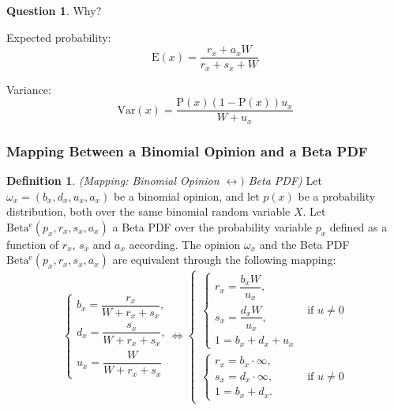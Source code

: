 \documentclass[a4paper,12pt]{article}
\theoremstyle{definition}
\newtheorem{question}{Question}[section]
\newtheorem{definition}{Definition}[section]
\numberwithin{equation}{section}
\begin{document}
\begin{question}
	Why?
\end{question} 

Expected probability:
\begin{equation}
	\mathrm{E}(x) = \frac{r_x + a_x W}{r_x + s_x + W}
\end{equation}

Variance:
\begin{equation}
	\mathrm{Var}(x) = \frac{\mathrm{P}(x)(1 - \mathrm{P}(x))u_x}{W + u_x}
\end{equation}

\subsubsection{Mapping Between a Binomial Opinion and a Beta PDF}

\begin{definition}
	\emph{(Mapping: Binomial Opinion $\leftrightarrow)$ Beta PDF)} Let $\omega_x = (b_x, d_x, u_x, a_x)$ be a binomial opinion, and let $p(x)$ be a probability distribution, both over the same binomial random variable $X$. Let $\mathrm{Beta^e}(p_x, r_x, s_x, a_x)$ a Beta PDF over the probability variable $p_x$ defined as a function of $r_x$, $s_x$ and
$a_x$ according. The opinion $\omega_x$ and the Beta PDF $\mathrm{Beta^e}(p_x, r_x, s_x, a_x)$ are
 equivalent through the following mapping:
	\begin{equation}
		\begin{cases}
			b_x = \dfrac{r_x}{W + r_x + s_x}\text{,}\\
			d_x = \dfrac{s_x}{W + r_x + s_x}\text{,}\\
			u_x = \dfrac{W}{W + r_x + s_x}
		\end{cases} \Leftrightarrow
		\begin{cases}
			\begin{cases}
				r_x = \dfrac{b_x W}{u_x}\text{,}\\
				s_x = \dfrac{d_x W}{u_x}\text{,}\\
				1 = b_x + d_x + u_x
			\end{cases} & \text{if } u \neq 0 \\
			\begin{cases}
				r_x = b_x \cdot \infty \text{,}\\
				s_x = d_x \cdot \infty \text{,}\\
				1 = b_x + d_x \text{.}
			\end{cases} & \text{if } u \neq 0
		\end{cases}
	\end{equation}
\end{definition}
\end{document}

